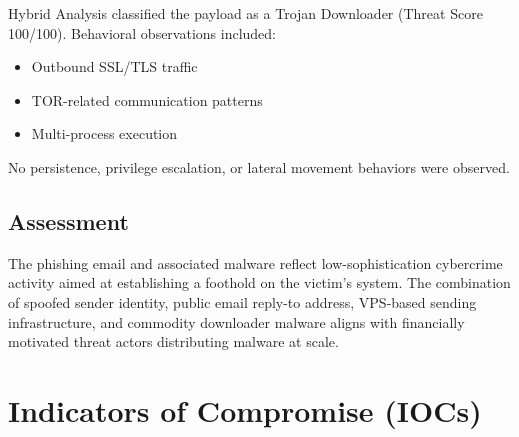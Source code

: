 \documentclass[12pt]{article}
\begin{document}
Hybrid Analysis classified the payload as a Trojan Downloader (Threat Score 100/100). Behavioral observations included:
\begin{itemize}[noitemsep]
    \item Outbound SSL/TLS traffic
    \item TOR-related communication patterns
    \item Multi-process execution
\end{itemize}

No persistence, privilege escalation, or lateral movement behaviors were observed.

\subsection{Assessment}
The phishing email and associated malware reflect low-sophistication cybercrime activity aimed at establishing a foothold on the victim’s system. The combination of spoofed sender identity, public email reply-to address, VPS-based sending infrastructure, and commodity downloader malware aligns with financially motivated threat actors distributing malware at scale.

\section{Indicators of Compromise (IOCs)}
\end{document}
